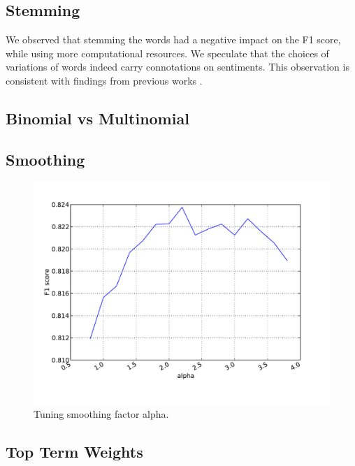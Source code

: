 \documentclass{article}
\begin{document}
\subsection{Stemming}


We observed that stemming the words had a negative impact on the F1 score, while using more computational resources. We speculate that the choices of variations of words indeed carry connotations on sentiments. This observation is consistent with findings from previous works \cite{stanford-tutorial, sentiment-twitter}.


\subsection{Binomial vs Multinomial}


\subsection{Smoothing}

\begin{figure}
  \centering
  \caption{Tuning smoothing factor alpha.}
  \includegraphics[width=\textwidth]{graphs/alpha.pdf}
\end{figure}


\subsection{Top Term Weights}
\end{document}

